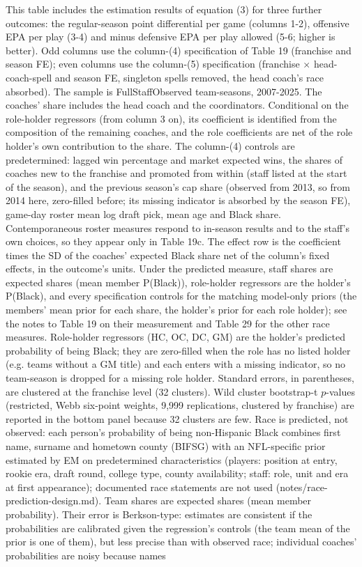\begin{table}[!h]
{\begin{threeparttable}
\begin{tablenotes}[para]
\item This table includes the estimation results of equation (3) for three further outcomes: the regular-season point differential per game (columns 1-2), offensive EPA per play (3-4) and minus defensive EPA per play allowed (5-6; higher is better). Odd columns use the column-(4) specification of Table 19 (franchise and season FE); even columns use the column-(5) specification (franchise $\times$ head-coach-spell and season FE, singleton spells removed, the head coach's race absorbed). The sample is FullStaffObserved team-seasons, 2007-2025. The coaches' share includes the head coach and the coordinators. Conditional on the role-holder regressors (from column 3 on), its coefficient is identified from the composition of the remaining coaches, and the role coefficients are net of the role holder's own contribution to the share. The column-(4) controls are predetermined: lagged win percentage and market expected wins, the shares of coaches new to the franchise and promoted from within (staff listed at the start of the season), and the previous season's cap share (observed from 2013, so from 2014 here, zero-filled before; its missing indicator is absorbed by the season FE), game-day roster mean log draft pick, mean age and Black share. Contemporaneous roster measures respond to in-season results and to the staff's own choices, so they appear only in Table 19c. The effect row is the coefficient times the SD of the coaches' expected Black share net of the column's fixed effects, in the outcome's units. Under the predicted measure, staff shares are expected shares (mean member P(Black)), role-holder regressors are the holder's P(Black), and every specification controls for the matching model-only priors (the members' mean prior for each share, the holder's prior for each role holder); see the notes to Table 19 on their measurement and Table 29 for the other race measures. Role-holder regressors (HC, OC, DC, GM) are the holder's predicted probability of being Black; they are zero-filled when the role has no listed holder (e.g. teams without a GM title) and each enters with a missing indicator, so no team-season is dropped for a missing role holder. Standard errors, in parentheses, are clustered at the franchise level (32 clusters). Wild cluster bootstrap-t $p$-values (restricted, Webb six-point weights, 9,999 replications, clustered by franchise) are reported in the bottom panel because 32 clusters are few. Race is predicted, not observed: each person's probability of being non-Hispanic Black combines first name, surname and hometown county (BIFSG) with an NFL-specific prior estimated by EM on predetermined characteristics (players: position at entry, rookie era, draft round, college type, county availability; staff: role, unit and era at first appearance); documented race statements are not used (notes/race-prediction-design.md). Team shares are expected shares (mean member probability). Their error is Berkson-type: estimates are consistent if the probabilities are calibrated given the regression's controls (the team mean of the prior is one of them), but less precise than with observed race; individual coaches' probabilities are noisy because names 
\end{tablenotes}
\end{threeparttable}}
\end{table}
